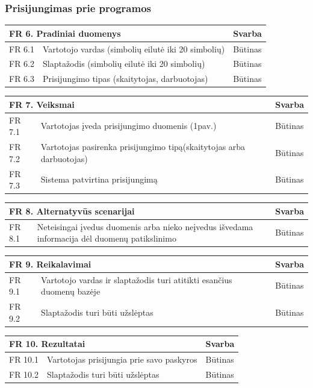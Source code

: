 \documentclass{VUMIFPSkursinis}
\begin{document}
 

\subsubsection{Prisijungimas prie programos}
\noindent
 \vspace{5mm}
 \begin{tabular}{ | p{} | p{} | p{} |}
    \hline
    \multicolumn{2}{|l|}{  FR 6. Pradiniai duomenys} &Svarba  \\ \hline 
  FR 6.1&  Vartotojo vardas (simbolių eilutė iki 20 simbolių)&  Būtinas\\ \hline
  FR 6.2&  Slaptažodis (simbolių eilutė iki 20 simbolių)&  Būtinas\\ \hline
  FR 6.3&  Prisijungimo tipas (skaitytojas, darbuotojas)&  Būtinas\\ \hline
  \end{tabular}
    \vspace{5mm}   
 \begin{tabular}{ | p{} | p{} | p{} |}
    \hline
        \multicolumn{2}{|l|}{  FR 7. Veiksmai} &Svarba  \\ \hline 
  FR 7.1&  Vartotojas įveda prisijungimo duomenis (1pav.)&  Būtinas\\ \hline
  FR 7.2&  Vartotojas pasirenka prisijungimo tipą(skaitytojas arba darbuotojas)&  Būtinas\\ \hline
  FR 7.3&  Sistema patvirtina prisijungimą&  Būtinas\\ \hline
    \end{tabular}
    \vspace{5mm}  
 \begin{tabular}{ | p{} | p{} | p{} |}
    \hline
   \multicolumn{2}{|l|}{  FR 8. Alternatyvūs scenarijai} &Svarba  \\ \hline 
  FR 8.1&  Neteisingai įvedus duomenis arba nieko neįvedus išvedama informacija dėl
 duomenų patikslinimo&  Būtinas\\ \hline
    \end{tabular}
 \vspace{5mm}
    \begin{tabular}{ | p{} | p{} | p{} |}
    \hline
     \multicolumn{2}{|l|}{  FR 9. Reikalavimai} &Svarba  \\ \hline 
  FR 9.1 &  Vartotojo vardas ir slaptažodis turi atitikti esančius duomenų bazėje & Būtinas\\ \hline
    FR 9.2& Slaptažodis turi būti užslėptas &Būtinas \\ \hline
    \end{tabular}
    \vspace{5mm}
     \begin{tabular}{ | p{} | p{} | p{} |}
    \hline
     \multicolumn{2}{|l|}{ FR 10. Rezultatai } &Svarba  \\ \hline 
 FR 10.1 & Vartotojas prisijungia prie savo paskyros & Būtinas\\ \hline
    FR 10.2& Slaptažodis turi būti užslėptas &Būtinas \\ \hline
    \end{tabular}
\end{document}
